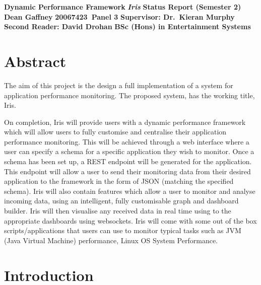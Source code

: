 \documentclass[12pt,a4paper,titlepage]{report}
\newcommand\AcademicTitle{Dynamic Performance Framework}
\newcommand\CommericalTitle{Iris}
\newcommand\Author{Dean Gaffney}
\newcommand\StudentID{20067423}
\newcommand\Report{Status Report (Semester 2)}
\newcommand\Reader{Supervisor: Dr.~Kieran Murphy}
\newcommand\SecondReader{Second Reader: David Drohan}
\begin{document}

\thispagestyle{empty}
\begin{center}
\mbox{}\vfill
{\fontsize{18pt}{20pt}\selectfont \bfseries \AcademicTitle}
\vfill
{\fontsize{14pt}{20pt}\selectfont \bfseries\itshape \CommericalTitle}
\vfill
{\fontsize{12pt}{20pt}\selectfont \bfseries \Report}
\vfill
{\fontsize{14pt}{20pt}\selectfont \bfseries \Author}
\vfill
{\fontsize{14pt}{20pt}\selectfont \bfseries \StudentID\ Panel 3}
\vfill
{\fontsize{14pt}{20pt}\selectfont \bfseries \Reader}
\vfill
{\fontsize{14pt}{20pt}\selectfont \bfseries \SecondReader}
\vfill
{\fontsize{14pt}{20pt}\selectfont \bfseries BSc (Hons) in Entertainment Systems}
\vfill
\end{center}
\clearpage

\tableofcontents
\listoftables
\listoffigures

\clearpage
{}
\setcounter{page}{1}

\chapter{Abstract}

The aim of this project is the design a full implementation of a system for application performance monitoring. The proposed system, has the working title,  Iris.

On completion, Iris will provide users with a dynamic performance framework which will allow users to fully customise and centralise their application performance monitoring. This will be achieved through a web interface where a user can specify a schema for a specific application they wish to monitor. Once a schema has been set up, a REST endpoint will be generated for the application. This endpoint will allow a user to send their monitoring data from their desired application to the framework in the form of JSON (matching the specified schema). Iris will also contain features which allow a user to monitor and analyse incoming data, using an intelligent, fully customisable graph and dashboard builder. Iris will then visualise any received data in real time using to the appropriate dashboards using websockets. Iris will come with some out of the box scripts/applications that users can use to monitor typical tasks such as JVM (Java Virtual Machine) performance, Linux OS System Performance.

\chapter{Introduction}
\end{document}
